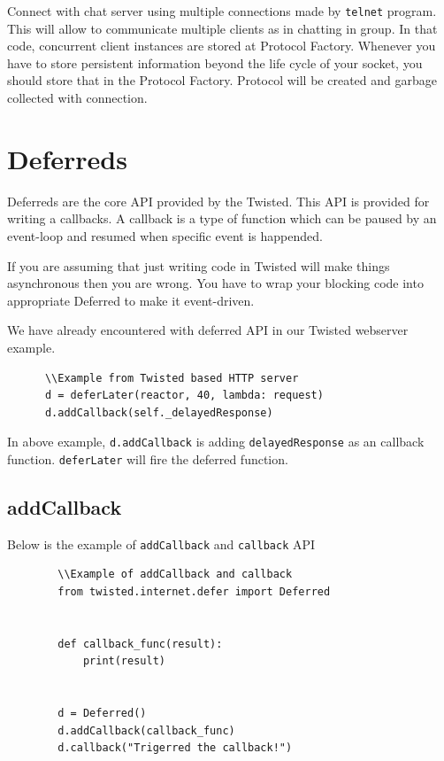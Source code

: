 \documentclass{article}
\begin{document}
    Connect with chat server using multiple connections made by \texttt{telnet}
    program. This will allow to communicate multiple clients as in chatting in
    group. In that code, concurrent client instances are stored at Protocol
    Factory. Whenever you have to store persistent information beyond the
    life cycle of your socket, you should store that in the Protocol Factory.
    Protocol will be created and garbage collected with connection.

  \section{Deferreds}
    Deferreds are the core API provided by the Twisted. This API is provided
    for writing a callbacks. A callback is a type of function which can be
    paused by an event-loop and resumed when specific event is happended.

    If you are assuming that just writing code in Twisted will make things
    asynchronous then you are wrong. You have to wrap your blocking code into
    appropriate Deferred to make it event-driven.

    We have already encountered with deferred API in our Twisted webserver
    example.

    \begin{verbatim}
      \\Example from Twisted based HTTP server
      d = deferLater(reactor, 40, lambda: request)
      d.addCallback(self._delayedResponse)
    \end{verbatim}

    In above example, \texttt{d.addCallback} is adding \texttt{delayedResponse}
    as an callback function. \texttt{deferLater} will fire the deferred
    function.

    \subsection{addCallback}
      Below is the example of \texttt{addCallback} and \texttt{callback} API

      \begin{verbatim}
        \\Example of addCallback and callback
        from twisted.internet.defer import Deferred


        def callback_func(result):
            print(result)


        d = Deferred()
        d.addCallback(callback_func)
        d.callback("Trigerred the callback!")
      \end{verbatim}
\end{document}

